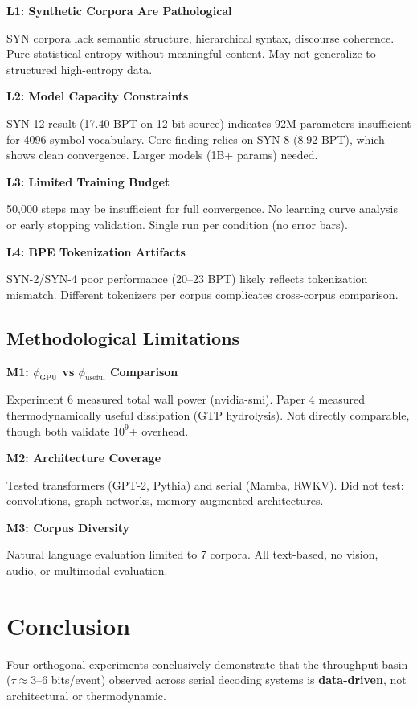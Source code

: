\documentclass[11pt,a4paper]{article}
\begin{document}
\textbf{L1: Synthetic Corpora Are Pathological}

SYN corpora lack semantic structure, hierarchical syntax, discourse coherence. Pure statistical entropy without meaningful content. May not generalize to structured high-entropy data.

\textbf{L2: Model Capacity Constraints}

SYN-12 result (17.40 BPT on 12-bit source) indicates 92M parameters insufficient for 4096-symbol vocabulary. Core finding relies on SYN-8 (8.92 BPT), which shows clean convergence. Larger models (1B+ params) needed.

\textbf{L3: Limited Training Budget}

50,000 steps may be insufficient for full convergence. No learning curve analysis or early stopping validation. Single run per condition (no error bars).

\textbf{L4: BPE Tokenization Artifacts}

SYN-2/SYN-4 poor performance (20--23 BPT) likely reflects tokenization mismatch. Different tokenizers per corpus complicates cross-corpus comparison.

\subsection{Methodological Limitations}

\textbf{M1: $\phi_{\text{GPU}}$ vs $\phi_{\text{useful}}$ Comparison}

Experiment 6 measured total wall power (nvidia-smi). Paper 4 measured thermodynamically useful dissipation (GTP hydrolysis). Not directly comparable, though both validate $10^9$+ overhead.

\textbf{M2: Architecture Coverage}

Tested transformers (GPT-2, Pythia) and serial (Mamba, RWKV). Did not test: convolutions, graph networks, memory-augmented architectures.

\textbf{M3: Corpus Diversity}

Natural language evaluation limited to 7 corpora. All text-based, no vision, audio, or multimodal evaluation.

\section{Conclusion}

Four orthogonal experiments conclusively demonstrate that the throughput basin ($\tau \approx 3$--6 bits/event) observed across serial decoding systems is \textbf{data-driven}, not architectural or thermodynamic.
\end{document}
